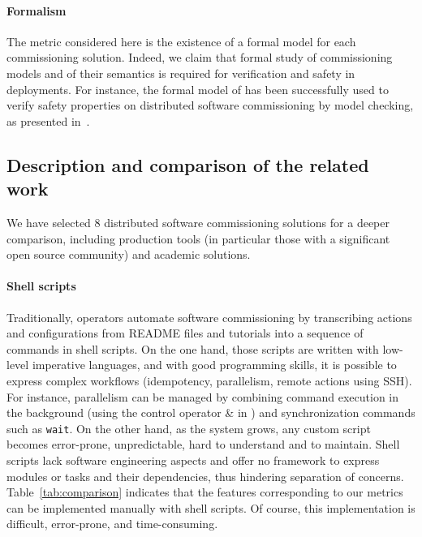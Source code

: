 \paragraph{Formalism}
The metric considered here is the existence of a formal model for each
commissioning solution. Indeed, we claim that formal study of
commissioning models and of their semantics is required for
verification and safety in deployments. For instance, the formal model
of \mad has been successfully used to verify safety properties on
distributed software commissioning by model checking, as presented
in~\cite{coullon:hal-02323641}.

\subsection{Description and comparison of the related work}

We have selected 8 distributed software commissioning solutions for a
deeper comparison, including production tools (in particular those
with a significant open source community) and academic solutions.
%

\paragraph{Shell scripts}
Traditionally, operators automate software commissioning by
transcribing actions and configurations from README files and
tutorials into a sequence of commands in shell scripts. On the one
hand, those scripts are written with low-level imperative languages,
and with good programming skills, it is possible to express complex
workflows (\eg idempotency, parallelism, remote actions using
SSH). For instance, parallelism can be managed by combining command
execution in the background (\eg using the control operator \& in
\bash) and synchronization commands such as \texttt{wait}. On the
other hand, as the system grows, any custom script becomes
error-prone, unpredictable, hard to understand and to maintain. Shell
scripts lack software engineering aspects and offer no framework to
express modules or tasks and their dependencies, thus hindering
separation of concerns. Table~\ref{tab:comparison} indicates that the
features corresponding to our metrics can be implemented manually with
shell scripts. Of course, this implementation is difficult, error-prone, and
time-consuming.

